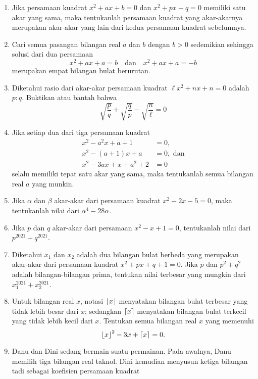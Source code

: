 \begin{enumerate}[topsep=0pt]
			\item Jika persamaan kuadrat $ x^{2} + ax + b = 0 $ dan $ x^{2} + px + q = 0 $ memiliki satu akar yang sama, maka tentukanlah persamaan kuadrat yang akar-akarnya merupakan akar-akar yang lain dari kedua persamaan kuadrat sebelumnya.
			\item Cari semua pasangan bilangan real $ a $ dan $ b $ dengan $ b > 0 $ sedemikian sehingga solusi dari dua persamaan
			\[ x^{2} + ax + a = b \quad \mbox{dan} \quad x^{2} + ax + a = -b \]
			merupakan empat bilangan bulat berurutan.
			\item {} Diketahui rasio dari akar-akar persamaan kuadrat $ \ell x^{2} + nx + n = 0 $ adalah $ p : q $. Buktikan atau bantah bahwa
			\[ \sqrt{\frac{p}{q}} + \sqrt{\frac{q}{p}} - \sqrt{\frac{n}{\ell}} = 0 \]
			\item Jika setiap dua dari tiga persamaan kuadrat
			\begin{align*}
				 x^{2} - a^{2}x + a + 1 &= 0, \\
				 x^{2} - \left(a + 1\right)x + a &= 0, \mbox{ dan} \\
				 x^{2} - 3ax + x + a^{2} + 2 &= 0
			\end{align*}
			selalu memiliki tepat satu akar yang sama, maka tentukanlah semua bilangan real $ a $ yang munkin.
			\item Jika $ \alpha $ dan $ \beta $ akar-akar dari persamaan kuadrat $ x^{2} - 2x - 5 = 0 $, maka tentukanlah nilai dari $ \alpha^{4} - 28\alpha $.
			\item Jika $ p $ dan $ q $ akar-akar dari persamaan $ x^{2} - x + 1 = 0 $, tentukanlah nilai dari $ p^{2021} + q^{2021} $.
			\item Diketahui $ x_{1} $ dan $ x_{2} $ adalah dua bilangan bulat berbeda yang merupakan akar-akar dari persamaan kuadrat $ x^{2} + px + q + 1 = 0 $. Jika $ p $ dan $ p^{2} + q^{2} $ adalah bilangan-bilangan prima, tentukan nilai terbesar yang mungkin dari $ x_{1}^{2021} + x_{2}^{2021} $.
			\item \probtype{*} Untuk bilangan real $ x $, notasi $ \mathop{}\!\left\lfloor{x}\right\rfloor $ menyatakan bilangan bulat terbesar yang tidak lebih besar dari $ x $; sedangkan $ \mathop{}\!\left\lceil{x}\right\rceil $ menyatakan bilangan bulat terkecil yang tidak lebih kecil dari $ x $. Tentukan semua bilangan real $ x $ yang memenuhi
			\[ \mathop{}\!\left\lfloor{x}\right\rfloor^{2} - 3x + \mathop{}\!\left\lceil{x}\right\rceil = 0. \]
			\item \probtype{*} Danu dan Dini sedang bermain suatu permainan. Pada awalnya, Danu memilih tiga bilangan real taknol. Dini kemudian menyusun ketiga bilangan tadi sebagai koefisien persamaan kuadrat

\end{enumerate}
